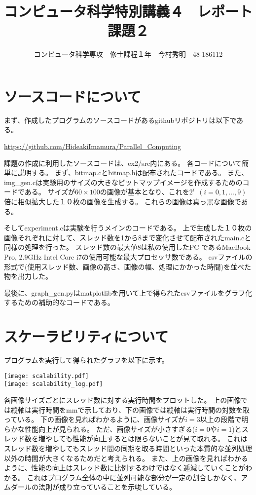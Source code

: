 \documentclass[11pt, oneside]{article}   	%
\title{コンピュータ科学特別講義４　レポート課題２}
\author{コンピュータ科学専攻　修士課程１年　今村秀明　48-186112}
\date{}							%
\begin{document}
\maketitle
\section{ソースコードについて}
まず、作成したプログラムのソースコードがあるgithubリポジトリは以下である。

\url{https://github.com/HideakiImamura/Parallel_Computing}

課題の作成に利用したソースコードは、ex2/src内にある。
各コードについて簡単に説明する。
まず、bitmap.cとbitmap.hは配布されたコードである。
また、img\_gen.cは実験用のサイズの大きなビットマップイメージを作成するためのコードである。
サイズが$60\times100$の画像が基本となり、これを$2^i\:\:(i = 0, 1, \ldots, 9)$倍に相似拡大した１０枚の画像を生成する。
これらの画像は真っ黒な画像である。

そしてexperiment.cは実験を行うメインのコードである。
上で生成した１０枚の画像それぞれに対して、スレッド数を1から8まで変化させて配布されたmain.cと同様の処理を行った。
スレッド数の最大値8は私の使用したPC であるMacBook Pro, 2.9GHz Intel Core i7の使用可能な最大プロセッサ数である。
csvファイルの形式で(使用スレッド数、画像の高さ、画像の幅、処理にかかった時間)を並べた物を出力した。

最後に、graph\_gen.pyはmatplotlibを用いて上で得られたcsvファイルをグラフ化するための補助的なコードである。

\section{スケーラビリティについて}
プログラムを実行して得られたグラフを以下に示す。
\begin{center}
\texttt{[image: scalability.pdf]}\\
\texttt{[image: scalability\_log.pdf]}
\end{center}

各画像サイズごとにスレッド数に対する実行時間をプロットした。
上の画像では縦軸は実行時間をmmで示しており、下の画像では縦軸は実行時間の対数を取っている。
下の画像を見ればわかるように、画像サイズが$i=3$以上の段階で明らかな性能向上が見られる。
ただ、画像サイズが小さすぎる($i=0$や$i=1$)とスレッド数を増やしても性能が向上するとは限らないことが見て取れる。
これはスレッド数を増やしてもスレッド間の同期を取る時間といった本質的な並列処理以外の時間が大きくなるためだと考えられる。
また、上の画像を見ればわかるように、性能の向上はスレッド数に比例するわけではなく逓減していくことがわかる。
これはプログラム全体の中に並列可能な部分が一定の割合しかなく、アムダールの法則が成り立っていることを示唆している。
\end{document}
